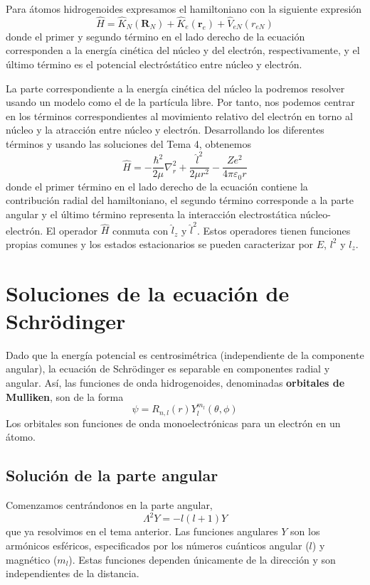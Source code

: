 \documentclass{tufte-handout}
\begin{document}
Para átomos hidrogenoides expresamos el hamiltoniano con la siguiente
expresión
\begin{equation}
    \hat{H}=\hat{K}_N(\mathbf{R}_N) + \hat{K}_e(\mathbf{r}_e) + \hat{V}_{eN}(r_{eN})
\end{equation}
donde el primer y segundo término en el lado derecho de la ecuación 
corresponden a la energía cinética del núcleo y del electrón, 
respectivamente, y el último término es el potencial electróstático 
entre núcleo y electrón. 

La parte correspondiente a la energía cinética del núcleo la
podremos resolver usando un modelo como el de la partícula
libre. Por tanto, nos podemos centrar en los términos 
correspondientes al movimiento relativo del electrón en torno
al núcleo y la atracción entre núcleo y electrón. Desarrollando 
los diferentes términos y usando las soluciones del Tema 4,
obtenemos
\begin{equation}
    \hat{H}=-\frac{\hbar^2}{2\mu}\nabla_r^2+ \frac{\hat{l}^2}{2\mu r^2} - \frac{Ze^2}{4\pi \varepsilon_0r}
\end{equation}
donde el primer término en el lado derecho de la ecuación
contiene la contribución radial del hamiltoniano, el segundo 
término corresponde a la parte angular y el último término
representa la interacción electrostática núcleo-electrón.
El operador $\hat{H}$ conmuta con $\hat{l}_z$ y $\hat{l}^2$. Estos
operadores tienen funciones propias comunes y los estados estacionarios
se pueden caracterizar por $E$, $l^2$ y $l_z$. 

\section{Soluciones de la ecuación de Schrödinger}
Dado que la energía potencial es centrosimétrica (independiente
de la componente angular), la ecuación de Schrödinger es separable
en componentes radial y angular. Así, las funciones de onda
hidrogenoides, denominadas \textbf{orbitales de Mulliken}, son de la forma
\begin{equation}
    \psi=R_{n,l}(r)Y^{m_l}_l(\theta,\phi)
\end{equation}
Los orbitales son funciones de onda monoelectrónicas para un
electrón en un átomo.

\subsection{Solución de la parte angular}
Comenzamos centrándonos en la parte angular, 
\begin{equation}
    \Lambda^2Y=-l(l+1)Y
\end{equation}
que ya resolvimos en el tema anterior. Las funciones angulares $Y$ 
son los armónicos esféricos, especificados por los números cuánticos
angular ($l$) y magnético ($m_l$). Estas funciones dependen únicamente
de la dirección y son independientes de la distancia. 
\end{document}

